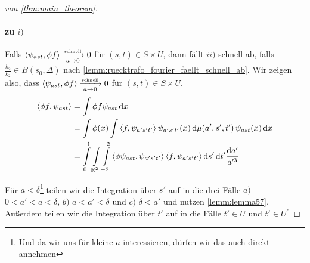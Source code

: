 \begin{proof}[von \ref{thm:main_theorem}]
\paragraph*{zu $i)$}
Falls $\left<\psi_{ast},\phi f\right> \xrightarrow[a \to 0]{\text{\tiny schnell}} 0$ für $(s,t) \in S \times U$, dann fällt $ii)$ schnell ab, falls $\frac{k_2}{k_2} \in B(s_0,\Delta)$ nach \cref{lemm:ruecktrafo_fourier_faellt_schnell_ab}. Wir zeigen also, dass $\left<\psi_{ast},\phi f\right> \xrightarrow[a \to 0]{\text{\tiny schnell}} 0$ für $(s,t) \in S \times U$.
\begin{align*}
    \left\langle \phi f, \psi_{ast} \right\rangle
    &=
    \int \phi f \psi_{ast} \mathop{}\!\mathrm{d} x
    \\&=
    \int \phi(x) \int \left\langle f, \psi_{a' s' t'} \right\rangle
    \psi_{a's't'} (x) \mathop{}\!\mathrm{d} \mu(a',s',t') \,\psi_{ast}(x) \mathop{}\!\mathrm{d} x
    \\&=
    \int\limits_{0}^{1} \int\limits_{\mathbb{R}^2} \int\limits_{-2}^2
    \left\langle \phi \psi_{ast}, \psi_{a's't'} \right\rangle
    \left\langle f, \psi_{a's't'} \right\rangle
    \mathop{}\!\mathrm{d} s' \mathop{}\!\mathrm{d} t' \frac{\mathop{}\!\mathrm{d} a'}{a^{\prime 3}}
\end{align*}


Für $a < \delta$\footnote{Und da wir uns für kleine $a$ interessieren, dürfen wir das auch direkt annehmen} teilen wir die Integration über $s'$ auf in die drei Fälle $a)$ $0<a'<a<\delta$, $b)$ $a < a' < \delta$ und $c)$ $\delta < a'$ und nutzen \cref{lemm:lemma57}. Außerdem teilen wir die Integration über $t'$ auf in die Fälle $t' \in U$ und $t' \in U^c$


\end{proof}
